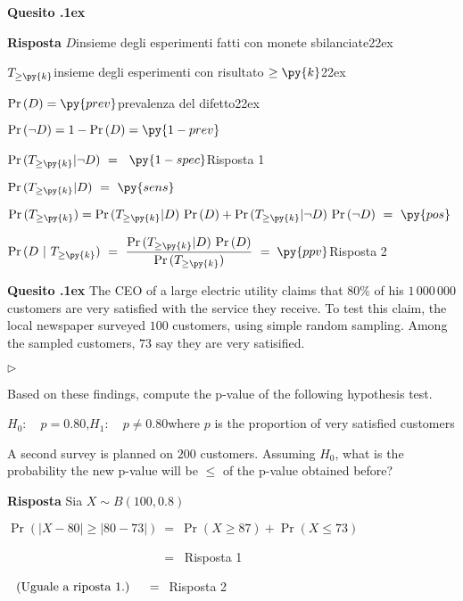\documentclass[11pt,twoside,a4paper]{article}
\newcommand{\mylabel}[1]{#1\hfill}
\renewenvironment{itemize}
  {\begin{list}{$\triangleright$}{%
   \setlength{\parskip}{0mm}
   \setlength{\topsep}{.4\baselineskip}
   \setlength{\rightmargin}{0mm}
   \setlength{\listparindent}{0mm}
   \setlength{\itemindent}{0mm}
   \setlength{\labelwidth}{2ex}
   \setlength{\itemsep}{.4\baselineskip}
   \setlength{\parsep}{0mm}
   \setlength{\partopsep}{0mm}
   \setlength{\labelsep}{1ex}
   \setlength{\leftmargin}{\labelwidth+\labelsep}
   \let\makelabel\mylabel}}{%
   \end{list}\vspace*{-1.3mm}}
\newcounter{quesito}
\newenvironment{question}{\addtocounter{quesito}{1}\par\textbf{Quesito \thequesito.\kern1ex}}{\vspace{0.5\parskip}}
\newenvironment{answer}{\par\textbf{Risposta\quad}}{\vspace{\parskip}}
\begin{document}
\begin{question}
\begin{answer}
$D$\hfill insieme degli esperimenti fatti con monete sbilanciate\kern22ex

$T_{\ge\py{k}}$\hfill insieme degli esperimenti con risultato $\ge\py{k}$\kern22ex

$\Pr(D)=\py{prev}$\hfill prevalenza del difetto\kern22ex

$\Pr(\neg D)=1-\Pr(D)=\py{1-prev}$

$\Pr(T_{\ge\py{k}}| \neg D)\ =\kern1ex${\color{blue} $\py{1-spec}$\hfill Risposta 1} 

$\Pr(T_{\ge\py{k}}| D)\ =\ \py{sens}$

$\Pr(T_{\ge\py{k}})=\Pr(T_{\ge\py{k}}|D)\ \Pr(D) + \Pr(T_{\ge\py{k}}|\neg D)\ \Pr(\neg D)\ =\ \py{pos}$

$\displaystyle\Pr(D ~|~T_{\ge\py{k}})\ =\ \frac{\Pr(T_{\ge\py{k}}| D)\ \Pr(D)}{\Pr(T_{\ge\py{k}})}\ =\kern1ex${\color{blue}$\py{ppv}$\hfill Risposta 2}

\end{answer}
\end{question}



\begin{question}
The CEO of a large electric utility claims that $80\%$ of his $1\,000\,000$ customers are very satisfied with the service they receive. To test this claim, the local newspaper surveyed $100$ customers, using simple random sampling. Among the sampled customers, $73$ say they are very satisified. 

\begin{itemize}
\item[1.] Based on these findings, compute the p-value of the following hypothesis test.

$H_0:\quad p = 0.80$,\qquad $H_1:\quad p \neq 0.80$\hfill  where $p$ is the proportion of very satisfied customers

\item[2.] A second survey is planned on $200$ customers. Assuming $H_0$, what is the probability the new p-value will be $\le$ of the p-value obtained before?
\end{itemize}
\begin{answer} Sia $X\sim B(100,0.8)$

$\Pr(|X-80|\ge|80-73|)
\ =\ 
\Pr(X\ge 87) + \Pr(X\le 73) $

$\phantom{\Pr(|X-80|\ge|80-73|)}
\ =\ $
{\color{blue}{\tt 1 - bimom.cdf(86, 100, 0.8) + bimom.cdf(72, 100, 0.8)}\hfill Risposta 1}

$\phantom{\Pr(|X-80|\ge|80-73|)}\llap{(Uguale a riposta 1.)\quad}
\ =\ $
{\color{blue}{\tt 1 - bimom.cdf(86, 100, 0.8) + bimom.cdf(72, 100, 0.8)} \hfill Risposta 2}


\end{answer}
\end{question}
\vfill
\hrulefill
\end{document}
